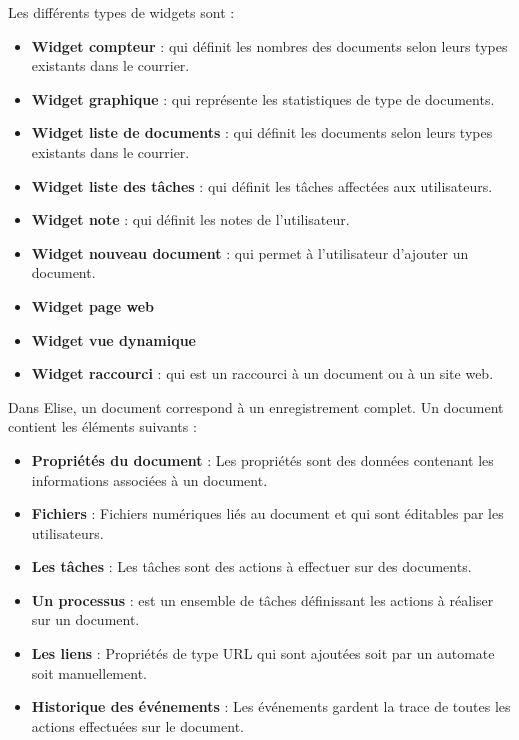 Les différents types de widgets sont :

\begin{itemize}

\item \textbf{Widget compteur} : qui définit les nombres des documents selon leurs types existants dans le courrier.
\item \textbf{Widget graphique} : qui représente les statistiques de type de documents.
\item \textbf{Widget liste de documents} : qui définit les documents selon leurs types existants dans le courrier.
\item \textbf{Widget liste des tâches} : qui définit les tâches affectées aux utilisateurs.
\item \textbf{Widget note} : qui définit les notes de l'utilisateur.
\item \textbf{Widget nouveau document} : qui permet à l'utilisateur d'ajouter un document.
\item \textbf{Widget page web}
\item \textbf{Widget vue dynamique}
\item \textbf{Widget raccourci} : qui est un raccourci à un document ou à un site web.

\end{itemize}

Dans Elise, un document correspond à un enregistrement complet. Un document contient les éléments suivants :

\begin{itemize}
\item \textbf{Propriétés du document} : Les propriétés sont des données contenant les informations associées à un document.
\item \textbf{Fichiers} : Fichiers numériques liés au document et qui sont éditables par les utilisateurs.
\item \textbf{Les tâches} : Les tâches sont des actions à effectuer sur des documents.
\item \textbf{Un processus} : est un ensemble de tâches définissant les actions à réaliser sur un document.
\item \textbf{Les liens} : Propriétés de type URL qui sont ajoutées soit par un automate soit manuellement.
\item \textbf{Historique des événements} : Les événements gardent la trace de toutes les actions effectuées sur le document.
\end{itemize}

